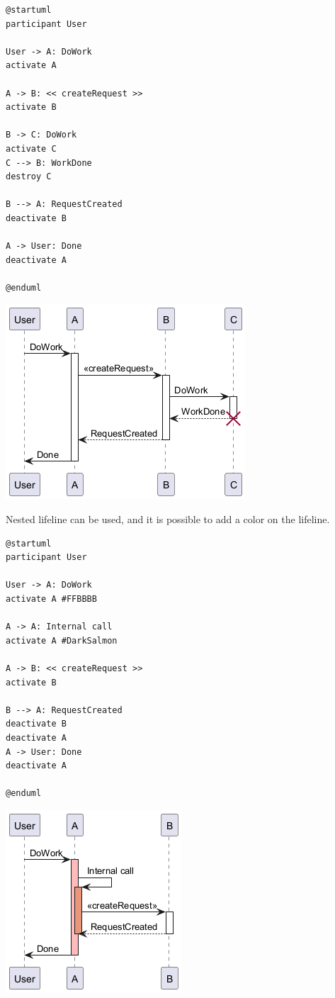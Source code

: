 \begin{verbatim}
@startuml
participant User

User -> A: DoWork
activate A

A -> B: << createRequest >>
activate B

B -> C: DoWork
activate C
C --> B: WorkDone
destroy C

B --> A: RequestCreated
deactivate B

A -> User: Done
deactivate A

@enduml
\end{verbatim}
\begin{center}
\includegraphics[scale=0.60]{imgw/img-b0041b383b98de46cd8d933a7be82e9c.png}
\end{center}




Nested lifeline can be used, and it is possible to add a color on the lifeline.


\begin{verbatim}
@startuml
participant User

User -> A: DoWork
activate A #FFBBBB

A -> A: Internal call
activate A #DarkSalmon

A -> B: << createRequest >>
activate B

B --> A: RequestCreated
deactivate B
deactivate A
A -> User: Done
deactivate A

@enduml
\end{verbatim}
\begin{center}
\includegraphics[scale=0.60]{imgw/img-6fd48effdebe01edcbaff4c8d18fbdc3.png}
\end{center}


